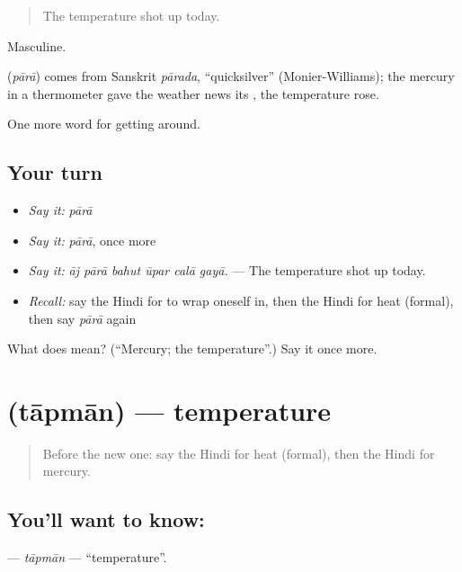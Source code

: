 \begin{quote}
The temperature shot up today.
\end{quote}

Masculine.

\begin{cousinweb}
\textbf{} (\emph{pārā}) comes from Sanskrit \emph{pārada}, \textquotedblleft{}quicksilver\textquotedblright{} (Monier-Williams); the mercury in a thermometer gave the weather news its  , the temperature rose.
\end{cousinweb}

\begin{grammarlens}[title={What you've built}]
One more word for getting around.
\end{grammarlens}

\subsection*{Your turn}
\begin{itemize}
\raggedright
  \item \emph{Say it:} \emph{pārā}
  \item \emph{Say it:} \emph{pārā}, once more
  \item \emph{Say it:} \emph{āj pārā bahut ūpar calā gayā.} — The temperature shot up today.
  \item \emph{Recall:} say the Hindi for to wrap oneself in, then the Hindi for heat (formal), then say \emph{pārā} again
\end{itemize}

\begin{tcolorbox}[breakable,colback=teal!4,colframe=teal!35!black,title={Before you move on}]
What does  mean? (\textquotedblleft{}Mercury; the temperature\textquotedblright{}.) Say it once more.
\end{tcolorbox}
\section[\texorpdfstring{\hi{तापमान} (tāpmān)}{तापमान (tāpmān)}]{ (tāpmān) — temperature}

\label{lesson:HI-C439-tapman}



\begin{quote}
Before the new one: say the Hindi for heat (formal), then the Hindi for mercury.
\end{quote}

\subsection*{You'll want to know: }
\textbf{} — \emph{tāpmān} — \textquotedblleft{}temperature\textquotedblright{}.


